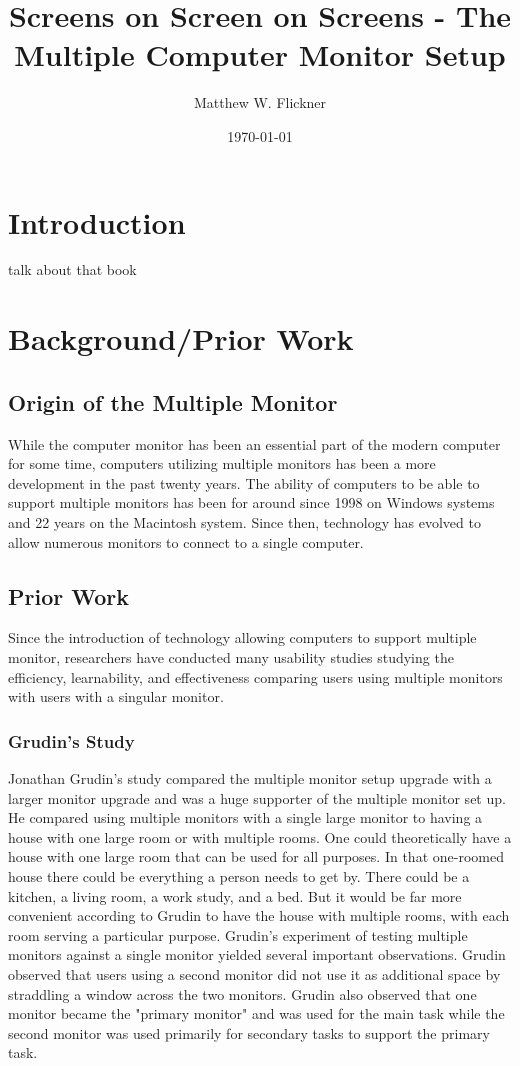 \documentclass[a4paper]{article}
\title{Screens on Screen on Screens - The Multiple Computer Monitor Setup}
\author{Matthew W. Flickner}
\date{\today}
\begin{document}
\maketitle

\begin{abstract}
\end{abstract}

\section{Introduction}

talk about that book

\section{Background/Prior Work}
\subsection{Origin of the Multiple Monitor}
While the computer monitor has been an essential part of the modern computer for some time, computers utilizing multiple monitors has been a more development in the past twenty years. The ability of computers to be able to support multiple monitors has been for around since 1998 on Windows systems and 22 years on the Macintosh system.\cite{Grudin}  Since then, technology has evolved to allow numerous monitors to connect to a single computer.

\subsection{Prior Work}
Since the introduction of technology allowing computers to support multiple monitor, researchers have conducted many usability studies studying the efficiency, learnability, and effectiveness comparing users using multiple monitors with users with a singular monitor.

\subsubsection{Grudin's Study}
Jonathan Grudin's study compared the multiple monitor setup upgrade with a larger monitor upgrade and was a huge supporter of the multiple monitor set up. He compared using multiple monitors with a single large monitor to having a house with one large room or with multiple rooms. One could theoretically have a house with one large room that can be used for all purposes. In that one-roomed house there could be everything a person needs to get by. There could be a kitchen, a living room, a work study, and a bed. But it would be far more convenient according to Grudin to have the house with multiple rooms, with each room serving a particular purpose.\cite{Grudin} Grudin's experiment of testing multiple monitors against a single monitor yielded several important observations. Grudin observed that users using a second monitor did not use it as additional space by straddling a window across the two monitors.\cite{Grudin} Grudin also observed that one monitor became the "primary monitor" and was used for the main task while the second monitor was used primarily for secondary tasks to support the primary task.
\end{document}
